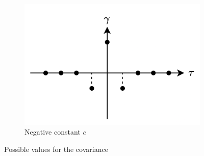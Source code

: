 \begin{example}
\begin{figure}[H]
\begin{subfigure}{0.49\textwidth}
            \centering
            \includegraphics[width=0.75\linewidth]{images/cneg.png}
            \caption{Negative constant $c$}
        \end{subfigure}
        \caption{Possible values for the covariance}
    \end{figure}
\end{example}